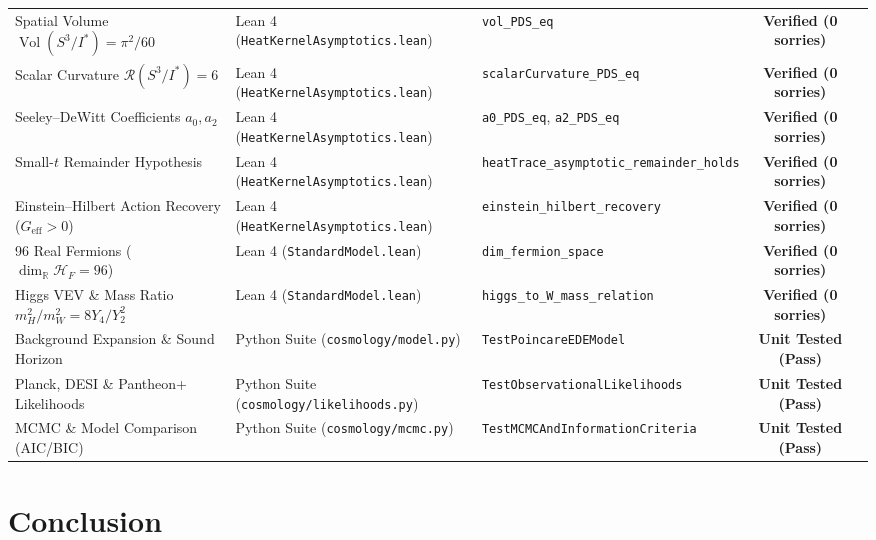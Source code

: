\documentclass[11pt,a4paper]{article}
\theoremstyle{definition}
\newcommand{\Vol}{\operatorname{Vol}}
\begin{document}
\begin{table}[htbp]
\begin{tabular}{lllcc}
Spatial Volume $\Vol(S^3/I^*) = \pi^2/60$ & Lean 4 (\texttt{HeatKernelAsymptotics.lean}) & \texttt{vol\_PDS\_eq} & \textbf{Verified (0 sorries)} \\
Scalar Curvature $\mathcal{R}(S^3/I^*) = 6$ & Lean 4 (\texttt{HeatKernelAsymptotics.lean}) & \texttt{scalarCurvature\_PDS\_eq} & \textbf{Verified (0 sorries)} \\
Seeley--DeWitt Coefficients $a_0, a_2$ & Lean 4 (\texttt{HeatKernelAsymptotics.lean}) & \texttt{a0\_PDS\_eq}, \texttt{a2\_PDS\_eq} & \textbf{Verified (0 sorries)} \\
Small-$t$ Remainder Hypothesis & Lean 4 (\texttt{HeatKernelAsymptotics.lean}) & \texttt{heatTrace\_asymptotic\_remainder\_holds} & \textbf{Verified (0 sorries)} \\
Einstein--Hilbert Action Recovery ($G_{\mathrm{eff}} > 0$) & Lean 4 (\texttt{HeatKernelAsymptotics.lean}) & \texttt{einstein\_hilbert\_recovery} & \textbf{Verified (0 sorries)} \\
96 Real Fermions ($\dim_{\mathbb{R}} \mathcal{H}_F = 96$) & Lean 4 (\texttt{StandardModel.lean}) & \texttt{dim\_fermion\_space} & \textbf{Verified (0 sorries)} \\
Higgs VEV \& Mass Ratio $m_H^2/m_W^2 = 8 Y_4 / Y_2^2$ & Lean 4 (\texttt{StandardModel.lean}) & \texttt{higgs\_to\_W\_mass\_relation} & \textbf{Verified (0 sorries)} \\
Background Expansion \& Sound Horizon & Python Suite (\texttt{cosmology/model.py}) & \texttt{TestPoincareEDEModel} & \textbf{Unit Tested (Pass)} \\
Planck, DESI \& Pantheon+ Likelihoods & Python Suite (\texttt{cosmology/likelihoods.py}) & \texttt{TestObservationalLikelihoods} & \textbf{Unit Tested (Pass)} \\
MCMC \& Model Comparison (AIC/BIC) & Python Suite (\texttt{cosmology/mcmc.py}) & \texttt{TestMCMCAndInformationCriteria} & \textbf{Unit Tested (Pass)} \\
\bottomrule
\end{tabular}
\end{table}

\section{Conclusion}
\end{document}
